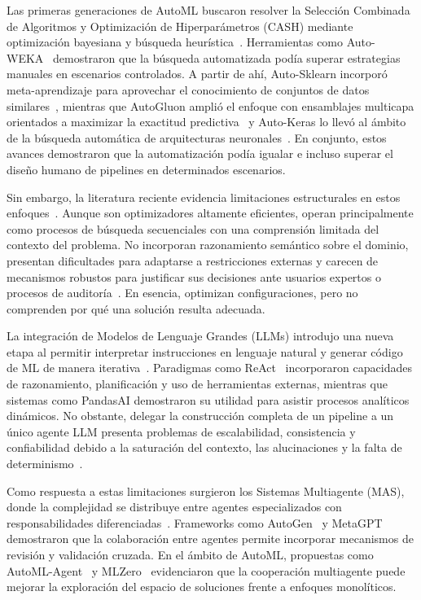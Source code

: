 \documentclass[conference]{IEEEtran}
\begin{document}
Las primeras generaciones de AutoML buscaron resolver la Selección Combinada de Algoritmos y Optimización de Hiperparámetros (CASH) mediante optimización bayesiana y búsqueda heurística~\cite{thornton2013}. Herramientas como Auto-WEKA~\cite{kotthoff2017} demostraron que la búsqueda automatizada podía superar estrategias manuales en escenarios controlados. A partir de ahí, Auto-Sklearn incorporó meta-aprendizaje para aprovechar el conocimiento de conjuntos de datos similares~\cite{feurer2019}, mientras que AutoGluon amplió el enfoque con ensamblajes multicapa orientados a maximizar la exactitud predictiva~\cite{erickson2020} y Auto-Keras lo llevó al ámbito de la búsqueda automática de arquitecturas neuronales~\cite{jin2019}. En conjunto, estos avances demostraron que la automatización podía igualar e incluso superar el diseño humano de pipelines en determinados escenarios.


Sin embargo, la literatura reciente evidencia limitaciones estructurales en estos enfoques~\cite{barbudo2023,baratchi2024}. Aunque son optimizadores altamente eficientes, operan principalmente como procesos de búsqueda secuenciales con una comprensión limitada del contexto del problema. No incorporan razonamiento semántico sobre el dominio, presentan dificultades para adaptarse a restricciones externas y carecen de mecanismos robustos para justificar sus decisiones ante usuarios expertos o procesos de auditoría~\cite{gundersen2018}. En esencia, optimizan configuraciones, pero no comprenden por qué una solución resulta adecuada.

La integración de Modelos de Lenguaje Grandes (LLMs) introdujo una nueva etapa al permitir interpretar instrucciones en lenguaje natural y generar código de ML de manera iterativa~\cite{wang2025llmagent}. Paradigmas como ReAct~\cite{yao2023react} incorporaron capacidades de razonamiento, planificación y uso de herramientas externas, mientras que sistemas como PandasAI demostraron su utilidad para asistir procesos analíticos dinámicos. No obstante, delegar la construcción completa de un pipeline a un único agente LLM presenta problemas de escalabilidad, consistencia y confiabilidad debido a la saturación del contexto, las alucinaciones y la falta de determinismo~\cite{huang2023mlagentbench,hong2024datainterpreter}.

Como respuesta a estas limitaciones surgieron los Sistemas Multiagente (MAS), donde la complejidad se distribuye entre agentes especializados con responsabilidades diferenciadas~\cite{balaji2010}. Frameworks como AutoGen~\cite{wu2023autogen} y MetaGPT~\cite{hong2023metagpt} demostraron que la colaboración entre agentes permite incorporar mecanismos de revisión y validación cruzada. En el ámbito de AutoML, propuestas como AutoML-Agent~\cite{trirat2025} y MLZero~\cite{fang2025mlzero} evidenciaron que la cooperación multiagente puede mejorar la exploración del espacio de soluciones frente a enfoques monolíticos.
\end{document}
